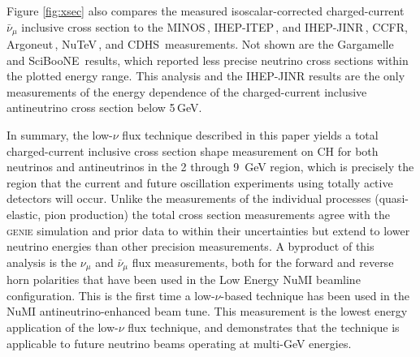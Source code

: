 \documentclass[%
reprint,
% 
superscriptaddress,
showpacs,
preprintnumbers,
showkeys,
nofootinbib,
 amsmath,amssymb,
 aps,
 prd,
floatfix,
]{revtex4-1}
\newcommand\numubar  {$\bar{\nu}_{\mu}$\xspace}
\newcommand\lownu    {low-$\nu$\xspace}
\newcommand\GENIE  {\textsc{genie}\xspace}
\begin{document}
Figure\,\,\ref{fig:xsec} also compares the measured isoscalar-corrected charged-current \numubar inclusive cross section to the MINOS\,\cite{MINOS-xsec}, IHEP-ITEP\,\cite{IHEP-ITEP-xsec}, and IHEP-JINR\,\cite{IHEP-JINR-xsec}, CCFR\cite{CCFR-xsec}, Argoneut\,\cite{Argoneut-xsec1,Argoneut-xsec2}, NuTeV\,\cite{NuTeV-xsec}, and CDHS\,\cite{CDHS-xsec} measurements. Not shown are the Gargamelle\,\cite{Gargamelle} and SciBooNE\,\cite{sciboone-inclusive} results, which reported less precise neutrino cross sections within the plotted energy range. This analysis and the IHEP-JINR results are the only measurements of the energy dependence of the charged-current inclusive antineutrino cross section below 5\,GeV. 

In summary, the \lownu flux technique described in this paper yields a total charged-current inclusive cross section shape measurement on CH for both neutrinos and antineutrinos in the 2 through 9~GeV region, which is precisely the region that the current and future oscillation experiments using totally active detectors will occur.  Unlike the measurements of the individual processes (quasi-elastic, pion production) the total cross section measurements agree with the \GENIE simulation and prior data to within their uncertainties but extend to lower neutrino energies than other precision measurements. A byproduct of this analysis is the $\nu_\mu$ and $\bar\nu_\mu$ flux measurements, both for the forward and reverse horn polarities that have been used in the Low Energy NuMI beamline configuration. This is the first time a \lownu-based technique has been used in the NuMI antineutrino-enhanced beam tune. This measurement is the lowest energy application of the \lownu flux technique, and demonstrates that the technique is applicable to future neutrino beams operating at multi-GeV energies. 

\vspace{1mm}
\begin{acknowledgments}
\vspace{-1mm}
 
\end{acknowledgments}

 

\clearpage


\begin{turnpage}
\end{turnpage}
\end{document}
